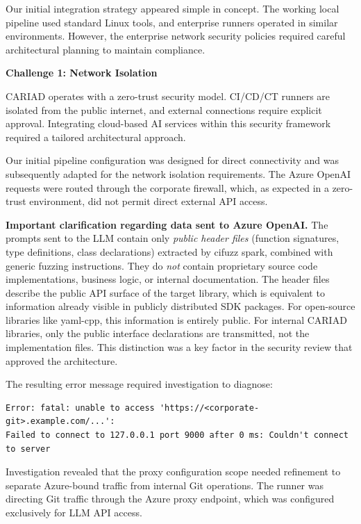Our initial integration strategy appeared simple in concept. The working local pipeline used standard Linux tools, and enterprise runners operated in similar environments. However, the enterprise network security policies required careful architectural planning to maintain compliance.

\textbf{Challenge 1: Network Isolation}

CARIAD operates with a zero-trust security model. CI/CD/CT runners are isolated from the public internet, and external connections require explicit approval. Integrating cloud-based AI services within this security framework required a tailored architectural approach.

Our initial pipeline configuration was designed for direct connectivity and was subsequently adapted for the network isolation requirements. The Azure OpenAI requests were routed through the corporate firewall, which, as expected in a zero-trust environment, did not permit direct external API access.

\textbf{Important clarification regarding data sent to Azure OpenAI.} The prompts sent to the LLM contain only \emph{public header files} (function signatures, type definitions, class declarations) extracted by cifuzz spark, combined with generic fuzzing instructions. They do \emph{not} contain proprietary source code implementations, business logic, or internal documentation. The header files describe the public API surface of the target library, which is equivalent to information already visible in publicly distributed SDK packages. For open-source libraries like yaml-cpp, this information is entirely public. For internal CARIAD libraries, only the public interface declarations are transmitted, not the implementation files. This distinction was a key factor in the security review that approved the architecture.

The resulting error message required investigation to diagnose:
\begin{lstlisting}
Error: fatal: unable to access 'https://<corporate-git>.example.com/...': 
Failed to connect to 127.0.0.1 port 9000 after 0 ms: Couldn't connect to server
\end{lstlisting}

Investigation revealed that the proxy configuration scope needed refinement to separate Azure-bound traffic from internal Git operations. The runner was directing Git traffic through the Azure proxy endpoint, which was configured exclusively for LLM API access.


